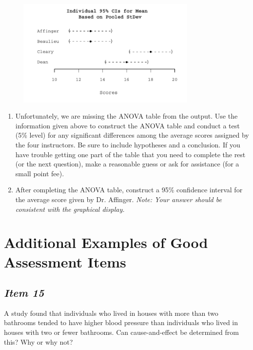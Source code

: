 \begin{figure}
\includegraphics[width=3.5in]{includes/Item7_R.pdf}
\end{figure}

\renewcommand{\labelenumi}{\arabic{enumi}.}
\begin{enumerate}[leftmargin=1cm, itemsep=.2em]
\item Unfortunately, we are missing the ANOVA table from the output. Use the information given above to construct the ANOVA table and conduct a test (5\% level) for any significant differences among the average scores assigned by the four instructors.  Be sure to include hypotheses and a conclusion.   If you have trouble getting one part of the table that you need to complete the rest (or the next question), make a reasonable guess or ask for assistance (for a small point fee). 
\item After completing the ANOVA table, construct a 95\% confidence interval for the average score given by Dr. Affinger. \textit{Note: Your answer should be consistent with the graphical display.}
\end{enumerate}


\section{\textbf{Additional Examples of Good Assessment Items}}

\subsection{\textbf{\textit{Item 15}}}
A study found that individuals who lived in houses with more than two bathrooms tended to have higher blood pressure than individuals who lived in houses with two or fewer bathrooms.  Can cause-and-effect be determined from this?  Why or why not?

